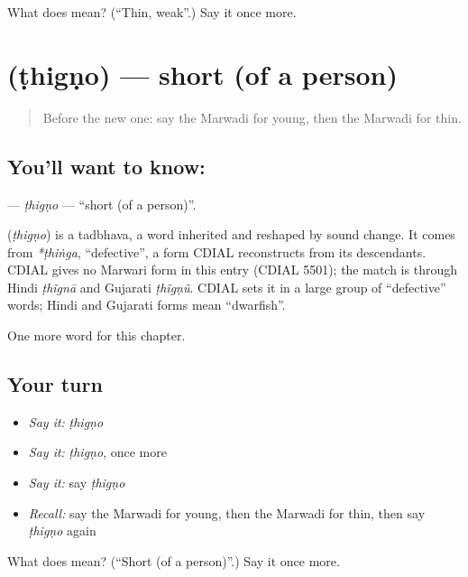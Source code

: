 \begin{tcolorbox}[breakable,colback=teal!4,colframe=teal!35!black,title={Before you move on}]
What does  mean? (\textquotedblleft{}Thin, weak\textquotedblright{}.) Say it once more.
\end{tcolorbox}
\section[\texorpdfstring{\mw{ठिगणो} (ṭhigṇo)}{ठिगणो (ṭhigṇo)}]{ (ṭhigṇo) — short (of a person)}

\label{lesson:MW-C144-thigno}



\begin{quote}
Before the new one: say the Marwadi for young, then the Marwadi for thin.
\end{quote}

\subsection*{You'll want to know: }
\textbf{} — \emph{ṭhigṇo} — \textquotedblleft{}short (of a person)\textquotedblright{}.

\begin{cousinweb}
\textbf{} (\emph{ṭhigṇo}) is a tadbhava, a word inherited and reshaped by sound change. It comes from \emph{*ṭhiṅga}, \textquotedblleft{}defective\textquotedblright{}, a form CDIAL reconstructs from its descendants. CDIAL gives no Marwari form in this entry (CDIAL 5501); the match is through Hindi \emph{ṭhĩgnā} and Gujarati \emph{ṭhĩgṇũ}. CDIAL sets it in a large group of \textquotedblleft{}defective\textquotedblright{} words; Hindi and Gujarati forms mean \textquotedblleft{}dwarfish\textquotedblright{}.
\end{cousinweb}

\begin{grammarlens}[title={What you've built}]
One more word for this chapter.
\end{grammarlens}

\subsection*{Your turn}
\begin{itemize}
\raggedright
  \item \emph{Say it:} \emph{ṭhigṇo}
  \item \emph{Say it:} \emph{ṭhigṇo}, once more
  \item \emph{Say it:} say \emph{ṭhigṇo}
  \item \emph{Recall:} say the Marwadi for young, then the Marwadi for thin, then say \emph{ṭhigṇo} again
\end{itemize}

\begin{tcolorbox}[breakable,colback=teal!4,colframe=teal!35!black,title={Before you move on}]
What does  mean? (\textquotedblleft{}Short (of a person)\textquotedblright{}.) Say it once more.
\end{tcolorbox}
